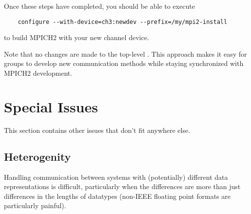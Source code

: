 \documentclass{article}
\begin{document}
Once these steps have completed, you should be able to execute
\begin{verbatim}
    configure --with-device=ch3:newdev --prefix=/my/mpi2-install
\end{verbatim}
to build MPICH2 with your new channel device.

Note that no changes are made to the top-level .  This
approach makes it easy for groups to develop new communication methods while
staying synchronized with MPICH2 development.



\section{Special Issues}
\label{sec:special-issues}

This section contains other issues that don't fit anywhere else.


\subsection{Heterogenity}
\label{sec:hetero-issues}

Handling communication between systems with (potentially) different data
representations is difficult, particularly when the differences are more than
just differences in the lengths of datatypes (non-IEEE floating point formats
are particularly painful).
\end{document}
